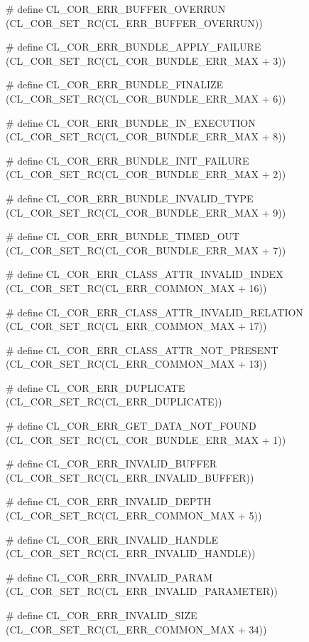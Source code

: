 \begin{flushleft}
\begin{CompactItemize}
\item \# define CL\_\-COR\_\-ERR\_\-BUFFER\_\-OVERRUN (CL\_\-COR\_\-SET\_\-RC(CL\_\-ERR\_\-BUFFER\_\-OVERRUN)) 
\item \# define CL\_\-COR\_\-ERR\_\-BUNDLE\_\-APPLY\_\-FAILURE (CL\_\-COR\_\-SET\_\-RC(CL\_\-COR\_\-BUNDLE\_\-ERR\_\-MAX + 3)) 
\item \# define CL\_\-COR\_\-ERR\_\-BUNDLE\_\-FINALIZE (CL\_\-COR\_\-SET\_\-RC(CL\_\-COR\_\-BUNDLE\_\-ERR\_\-MAX + 6)) 
\item \# define CL\_\-COR\_\-ERR\_\-BUNDLE\_\-IN\_\-EXECUTION (CL\_\-COR\_\-SET\_\-RC(CL\_\-COR\_\-BUNDLE\_\-ERR\_\-MAX + 8)) 
\item \# define CL\_\-COR\_\-ERR\_\-BUNDLE\_\-INIT\_\-FAILURE (CL\_\-COR\_\-SET\_\-RC(CL\_\-COR\_\-BUNDLE\_\-ERR\_\-MAX + 2)) 
\item \# define CL\_\-COR\_\-ERR\_\-BUNDLE\_\-INVALID\_\-TYPE (CL\_\-COR\_\-SET\_\-RC(CL\_\-COR\_\-BUNDLE\_\-ERR\_\-MAX + 9)) 
\item \# define CL\_\-COR\_\-ERR\_\-BUNDLE\_\-TIMED\_\-OUT (CL\_\-COR\_\-SET\_\-RC(CL\_\-COR\_\-BUNDLE\_\-ERR\_\-MAX + 7)) 
\item \# define CL\_\-COR\_\-ERR\_\-CLASS\_\-ATTR\_\-INVALID\_\-INDEX (CL\_\-COR\_\-SET\_\-RC(CL\_\-ERR\_\-COMMON\_\-MAX + 16)) 
\item \# define CL\_\-COR\_\-ERR\_\-CLASS\_\-ATTR\_\-INVALID\_\-RELATION (CL\_\-COR\_\-SET\_\-RC(CL\_\-ERR\_\-COMMON\_\-MAX + 17)) 
\item \# define CL\_\-COR\_\-ERR\_\-CLASS\_\-ATTR\_\-NOT\_\-PRESENT (CL\_\-COR\_\-SET\_\-RC(CL\_\-ERR\_\-COMMON\_\-MAX + 13)) 
\item \# define CL\_\-COR\_\-ERR\_\-DUPLICATE (CL\_\-COR\_\-SET\_\-RC(CL\_\-ERR\_\-DUPLICATE)) 
\item \# define CL\_\-COR\_\-ERR\_\-GET\_\-DATA\_\-NOT\_\-FOUND (CL\_\-COR\_\-SET\_\-RC(CL\_\-COR\_\-BUNDLE\_\-ERR\_\-MAX + 1)) 
\item \# define CL\_\-COR\_\-ERR\_\-INVALID\_\-BUFFER (CL\_\-COR\_\-SET\_\-RC(CL\_\-ERR\_\-INVALID\_\-BUFFER)) 
\item \# define CL\_\-COR\_\-ERR\_\-INVALID\_\-DEPTH (CL\_\-COR\_\-SET\_\-RC(CL\_\-ERR\_\-COMMON\_\-MAX + 5)) 
\item \# define CL\_\-COR\_\-ERR\_\-INVALID\_\-HANDLE (CL\_\-COR\_\-SET\_\-RC(CL\_\-ERR\_\-INVALID\_\-HANDLE)) 
\item \# define CL\_\-COR\_\-ERR\_\-INVALID\_\-PARAM (CL\_\-COR\_\-SET\_\-RC(CL\_\-ERR\_\-INVALID\_\-PARAMETER)) 
\item \# define CL\_\-COR\_\-ERR\_\-INVALID\_\-SIZE (CL\_\-COR\_\-SET\_\-RC(CL\_\-ERR\_\-COMMON\_\-MAX + 34)) 

\end{CompactItemize}
\end{flushleft}
